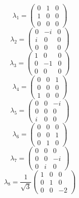 {
\begin{equation*}
\lambda_{1}=\begin{pmatrix} 
0&1&0\\
1&0&0\\
0&0&0
\end{pmatrix}
\end{equation*}
\vspace{0.2cm}
\begin{equation*}
\lambda_{2}=\begin{pmatrix} 
0&-i&0\\
i&0&0\\
0&0&0
\end{pmatrix}
\end{equation*}
\vspace{0.2cm}
\begin{equation*}
\lambda_{3}=\begin{pmatrix} 
1&0&0\\
0&-1&0\\
0&0&0
\end{pmatrix}
\end{equation*}
\vspace{0.2cm}
\begin{equation*}
\lambda_{4}=\begin{pmatrix} 
0&0&1\\
0&0&0\\
1&0&0
\end{pmatrix}
\end{equation*}
\vspace{0.2cm}
\begin{equation*}
\lambda_{5}=\begin{pmatrix} 
0&0&-i\\
0&0&0\\
i&0&0
\end{pmatrix}
\end{equation*}
\vspace{0.2cm}
\begin{equation*}
\lambda_{6}=\begin{pmatrix} 
0&0&0\\
0&0&1\\
0&1&0
\end{pmatrix}
\end{equation*}
\vspace{0.2cm}
\begin{equation*}
\lambda_{7}=\begin{pmatrix} 
0&0&0\\
0&0&-i\\
0&i&0
\end{pmatrix}
\end{equation*}
\vspace{0.2cm}
\begin{equation*}
\lambda_{8}=\frac{1}{\sqrt{3}}\begin{pmatrix} 
1&0&0\\
0&1&0\\
0&0&-2
\end{pmatrix}
\end{equation*}
\label{Gell-Mann}
}

